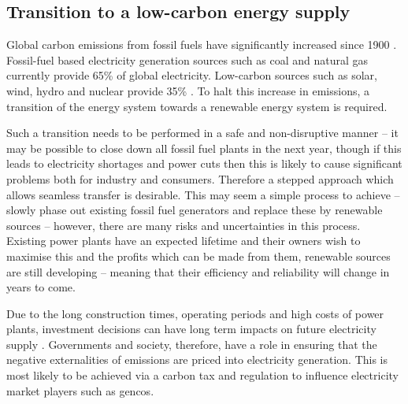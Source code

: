 \subsection{Transition to a low-carbon energy supply}

Global carbon emissions from fossil fuels have significantly increased since 1900 \cite{boden2017global}.    Fossil-fuel based electricity generation sources such as coal and natural gas currently provide 65\% of global electricity. Low-carbon sources such as solar, wind, hydro and nuclear provide 35\% \cite{BP2018}. To halt this increase in  emissions, a transition of the energy system towards a renewable energy system is required. 





Such a transition needs to be performed in a safe and non-disruptive manner -- it may be possible to close down all fossil fuel plants in the next year, though if this leads to electricity shortages and power cuts then this is likely to cause significant problems both for industry and consumers. Therefore a stepped approach which allows seamless transfer is desirable. This may seem a simple process to achieve -- slowly phase out existing fossil fuel generators and replace these by renewable sources -- however, there are many risks and uncertainties in this process. Existing power plants have an expected lifetime and their owners wish to maximise this and the profits which can be made from them, renewable sources are still developing -- meaning that their efficiency and reliability will change in years to come.

Due to the long construction times, operating periods and high costs of power plants, investment decisions can have long term impacts on future electricity supply \cite{Chappin2017}. Governments and society, therefore, have a role in ensuring that the negative externalities of emissions are priced into electricity generation. This is most likely to be achieved via a carbon tax and regulation to influence electricity market players such as \acrfull{gencos}.


